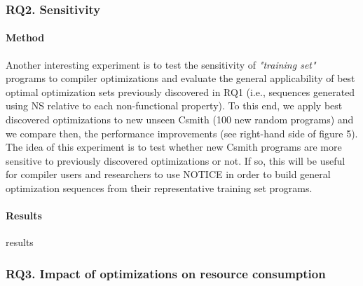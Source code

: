 


\noindent{}
\subsubsection{RQ2. Sensitivity}
\paragraph{Method}
Another interesting experiment is to test the sensitivity of \textit{"training set"} programs to compiler optimizations and evaluate the general applicability of best optimal optimization sets previously discovered in RQ1 (i.e., sequences generated using NS relative to each non-functional property). To this end, we apply best discovered optimizations to new unseen Csmith (100 new random programs) and we compare then, the performance improvements (see right-hand side of figure 5). The idea of this experiment is to test whether new Csmith programs are more sensitive to previously discovered optimizations or not. If so, this will be useful for compiler users and researchers to use NOTICE in order to build general optimization sequences from their representative training set programs.

\paragraph{Results}
results

\noindent{}
\subsubsection{RQ3. Impact of optimizations on resource consumption}
